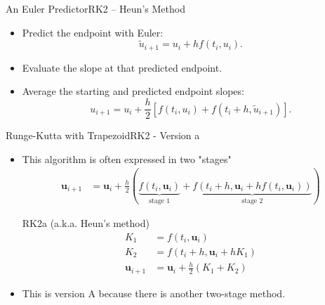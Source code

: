 \documentclass[10pt]{beamer}
\begin{document}
\begin{frame}{An Euler Predictor}{RK2 -- Heun's Method}
\begin{itemize}
    \item Predict the endpoint with Euler:
    \[\widetilde{u}_{i+1}=u_i+h f(t_i,u_i).\]
    \item Evaluate the slope at that predicted endpoint.
    \item Average the starting and predicted endpoint slopes:
    \[u_{i+1}=u_i+\frac{h}{2}\left[f(t_i,u_i)+f(t_i+h,\widetilde{u}_{i+1})\right].\]
\end{itemize}
\end{frame}



\begin{frame}{Runge-Kutta with Trapezoid}{RK2 - Version a}
\begin{itemize}
   \item This algorithm is often expressed in two "stages"
   \begin{align*}
      \textbf{u}_{i+1} &= \textbf{u}_i + \frac{h}{2}(\underbrace{f(t_i, \textbf{u}_i)}_{\text{stage 1}} + \underbrace{f\left(t_{i}+h, \textbf{u}_i +  h f(t_i,\textbf{u}_i) \right)}_{\text{stage 2}} )
   \end{align*}

    \begin{block}{RK2a (a.k.a. Heun's method)}
    \vspace{-12pt}
    \begin{align*}
    K_1 &= f(t_i,\textbf{u}_i)\\
    K_2 &= f(t_i + h, \textbf{u}_i + h K_1)\\
       \textbf{u}_{i+1} &= \textbf{u}_i + \frac{h}{2}(K_1 + K_2)
    \end{align*}
    \end{block}
    \item This is version A because there is another two-stage method.
\end{itemize}
\end{frame}


\end{document}
